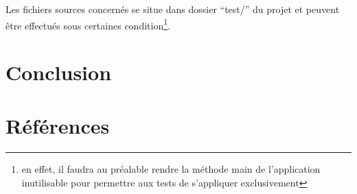 \documentclass[a4paper,11pt]{report}
\begin{document}
Les fichiers sources concernés se situe dans dossier ``test/'' du projet et
peuvent être effectués sous certaines condition\footnote{en effet, il faudra au
	préalable rendre la méthode main de l'application inutilisable pour 
permettre aux tests de s'appliquer exclusivement}.
\chapter{Conclusion}


\appendix


\chapter{Références}
\end{document}
